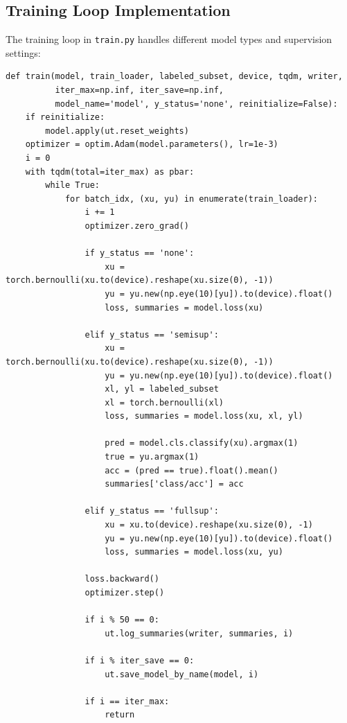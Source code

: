 \documentclass{article}
\begin{document}
\subsection{Training Loop Implementation}

The training loop in \texttt{train.py} handles different model types and supervision settings:

\begin{verbatim}
def train(model, train_loader, labeled_subset, device, tqdm, writer,
          iter_max=np.inf, iter_save=np.inf,
          model_name='model', y_status='none', reinitialize=False):
    if reinitialize:
        model.apply(ut.reset_weights)
    optimizer = optim.Adam(model.parameters(), lr=1e-3)
    i = 0
    with tqdm(total=iter_max) as pbar:
        while True:
            for batch_idx, (xu, yu) in enumerate(train_loader):
                i += 1
                optimizer.zero_grad()

                if y_status == 'none':
                    xu = torch.bernoulli(xu.to(device).reshape(xu.size(0), -1))
                    yu = yu.new(np.eye(10)[yu]).to(device).float()
                    loss, summaries = model.loss(xu)

                elif y_status == 'semisup':
                    xu = torch.bernoulli(xu.to(device).reshape(xu.size(0), -1))
                    yu = yu.new(np.eye(10)[yu]).to(device).float()
                    xl, yl = labeled_subset
                    xl = torch.bernoulli(xl)
                    loss, summaries = model.loss(xu, xl, yl)

                    pred = model.cls.classify(xu).argmax(1)
                    true = yu.argmax(1)
                    acc = (pred == true).float().mean()
                    summaries['class/acc'] = acc

                elif y_status == 'fullsup':
                    xu = xu.to(device).reshape(xu.size(0), -1)
                    yu = yu.new(np.eye(10)[yu]).to(device).float()
                    loss, summaries = model.loss(xu, yu)

                loss.backward()
                optimizer.step()

                if i % 50 == 0:
                    ut.log_summaries(writer, summaries, i)

                if i % iter_save == 0:
                    ut.save_model_by_name(model, i)

                if i == iter_max:
                    return
\end{verbatim}
\end{document}
